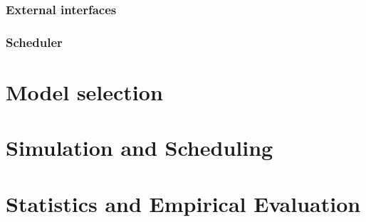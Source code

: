 \subsubsection{External interfaces}

\subsubsection{Scheduler}


 



\section{Model selection}


\section{Simulation and Scheduling}


\section{Statistics and Empirical Evaluation}


